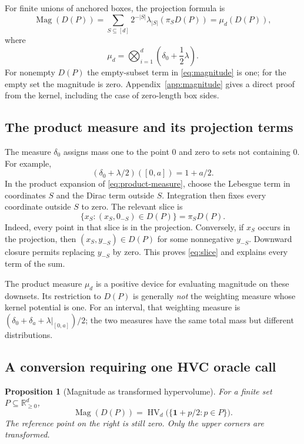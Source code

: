 \documentclass[12pt,a4paper]{article}
\newtheorem{proposition}[theorem]{Proposition}
\theoremstyle{definition}
\theoremstyle{remark}
\newcommand{\R}{\mathbb R}
\newcommand{\HV}{\operatorname{HV}}
\newcommand{\Mag}{\operatorname{Mag}}
\newcommand{\one}{\mathbf 1}
\begin{document}
For finite unions of anchored boxes, the projection formula is
\cite[Theorem 3.3]{Emmerich2026}
\begin{equation}
 \boxed{\Mag(D(P))=
 \sum_{S\subseteq[d]}2^{-|S|}\lambda_{|S|}(\pi_S D(P))
 =\mu_d(D(P)),}
 \label{eq:magnitude}
\end{equation}
where
\begin{equation}
 \mu_d=\bigotimes_{i=1}^d\left(\delta_0+\frac12\lambda\right).
 \label{eq:product-measure}
\end{equation}
For nonempty $D(P)$ the empty-subset term in \eqref{eq:magnitude} is one;
for the empty set the magnitude is zero. Appendix~\ref{app:magnitude}
gives a direct proof from the kernel, including the case of zero-length
box sides.

\subsection{The product measure and its projection terms}

The measure $\delta_0$ assigns mass one to the point $0$ and zero to
sets not containing $0$. For example,
\[
 (\delta_0+\lambda/2)([0,a])=1+a/2.
\]
In the product expansion of \eqref{eq:product-measure}, choose the
Lebesgue term in coordinates $S$ and the Dirac term outside $S$.
Integration then fixes every coordinate outside $S$ to zero. The relevant
slice is
\begin{equation}
 \{x_S:(x_S,0_{-S})\in D(P)\}=\pi_S D(P).
 \label{eq:slice}
\end{equation}
Indeed, every point in that slice is in the projection. Conversely, if
$x_S$ occurs in the projection, then $(x_S,y_{-S})\in D(P)$ for some
nonnegative $y_{-S}$. Downward closure permits replacing $y_{-S}$ by
zero. This proves \eqref{eq:slice} and explains every term of the sum.

The product measure $\mu_d$ is a positive device for evaluating magnitude
on these downsets. Its restriction to $D(P)$ is generally \emph{not} the
weighting measure whose kernel potential is one. For an interval, that
weighting measure is $(\delta_0+\delta_a+\lambda|_{[0,a]})/2$; the two
measures have the same total mass but different distributions.

\subsection{A conversion requiring one HVC oracle call}

\begin{proposition}[Magnitude as transformed hypervolume]
\label{prop:mag-hv}
For a finite set $P\subseteq\R_{\ge0}^d$,
\begin{equation}
 \boxed{\Mag(D(P))=
 \HV_d\bigl(\{\one+p/2:p\in P\}\bigr).}
 \label{eq:mag-hv}
\end{equation}
The reference point on the right is still zero. Only the upper corners
are transformed.
\end{proposition}
\end{document}
